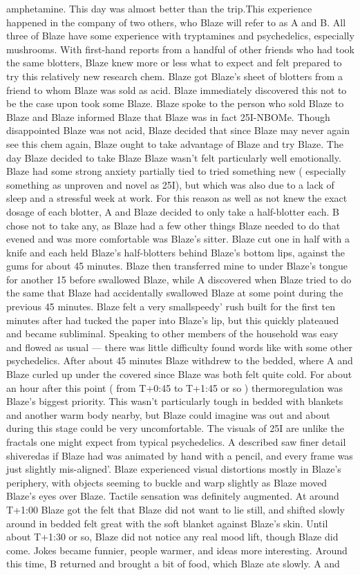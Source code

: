 \documentclass[12pt]{book}
\begin{document}
amphetamine. This day was almost better than the trip.This experience happened in the company of two others, who Blaze will refer to as A and B. All three of Blaze have some experience with tryptamines and psychedelics, especially mushrooms. With first-hand reports from a handful of other friends who had took the same blotters, Blaze knew more or less what to expect and felt prepared to try this relatively new research chem. Blaze got Blaze's sheet of blotters from a friend to whom Blaze was sold as acid. Blaze immediately discovered this not to be the case upon took some Blaze. Blaze spoke to the person who sold Blaze to Blaze and Blaze informed Blaze that Blaze was in fact 25I-NBOMe. Though disappointed Blaze was not acid, Blaze decided that since Blaze may never again see this chem again, Blaze ought to take advantage of Blaze and try Blaze. The day Blaze decided to take Blaze Blaze wasn't felt particularly well emotionally. Blaze had some strong anxiety partially tied to tried something new ( especially something as unproven and novel as 25I), but which was also due to a lack of sleep and a stressful week at work. For this reason as well as not knew the exact dosage of each blotter, A and Blaze decided to only take a half-blotter each. B chose not to take any, as Blaze had a few other things Blaze needed to do that evened and was more comfortable was Blaze's sitter. Blaze cut one in half with a knife and each held Blaze's half-blotters behind Blaze's bottom lips, against the gums for about 45 minutes. Blaze then transferred mine to under Blaze's tongue for another 15 before swallowed Blaze, while A discovered when Blaze tried to do the same that Blaze had accidentally swallowed Blaze at some point during the previous 45 minutes. Blaze felt a very smallspeedy' rush built for the first ten minutes after had tucked the paper into Blaze's lip, but this quickly plateaued and became subliminal. Speaking to other members of the household was easy and flowed as usual --- there was little difficulty found words like with some other psychedelics. After about 45 minutes Blaze withdrew to the bedded, where A and Blaze curled up under the covered since Blaze was both felt quite cold. For about an hour after this point ( from T+0:45 to T+1:45 or so ) thermoregulation was Blaze's biggest priority. This wasn't particularly tough in bedded with blankets and another warm body nearby, but Blaze could imagine was out and about during this stage could be very uncomfortable. The visuals of 25I are unlike the fractals one might expect from typical psychedelics. A described saw finer detail shiveredas if Blaze had was animated by hand with a pencil, and every frame was just slightly mis-aligned'. Blaze experienced visual distortions mostly in Blaze's periphery, with objects seeming to buckle and warp slightly as Blaze moved Blaze's eyes over Blaze. Tactile sensation was definitely augmented. At around T+1:00 Blaze got the felt that Blaze did not want to lie still, and shifted slowly around in bedded felt great with the soft blanket against Blaze's skin. Until about T+1:30 or so, Blaze did not notice any real mood lift, though Blaze did come. Jokes became funnier, people warmer, and ideas more interesting. Around this time, B returned and brought a bit of food, which Blaze ate slowly. A and 
\end{document}
